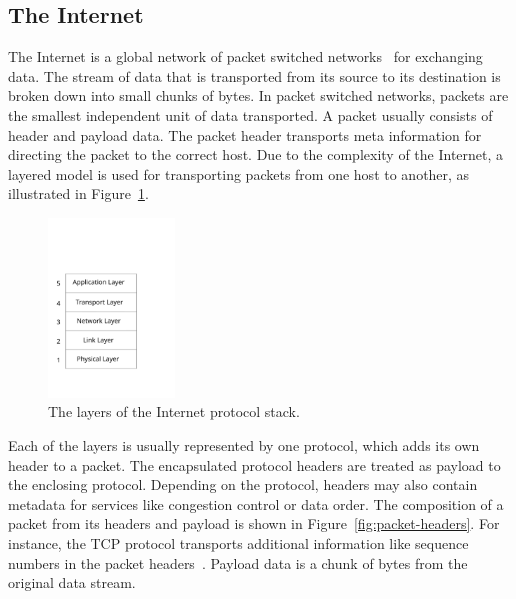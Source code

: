 \documentclass[a4paper,
		12pt,
		parskip=full,
		titlepage
		]{scrartcl}
\begin{document}
\subsection{The Internet}
The Internet is a global network of packet switched networks~\cite[Chapter 1.1]{kurose_ross} for exchanging data. 
The stream of data that is transported from its source to its destination is broken down into small chunks of bytes.
In packet switched networks, packets are the smallest independent unit of data transported.
A packet usually consists of header and payload data.
The packet header transports meta information for directing the packet to the correct host.
Due to the complexity of the Internet, a layered model is used for transporting 
packets from one host to another, as illustrated in Figure~\ref{fig:layermodel}.
\begin{figure}[H]
\centering
\includegraphics[width=0.3\textwidth]{images/internet-layers}
\caption{The layers of the Internet protocol stack.}
\label{fig:layermodel}
\end{figure}
Each of the layers is usually represented by one protocol, which adds its own header to a packet.
The encapsulated protocol headers are treated as payload to the enclosing protocol.
Depending on the protocol, headers may also contain metadata for services like congestion control or data order.
The composition of a packet from its headers and payload is shown in Figure~\ref{fig:packet-headers}.
For instance, the TCP protocol transports additional information like sequence numbers in the packet headers~\cite[Chapter 3.5]{kurose_ross}.
Payload data is a chunk of bytes from the original data stream.
\end{document}
